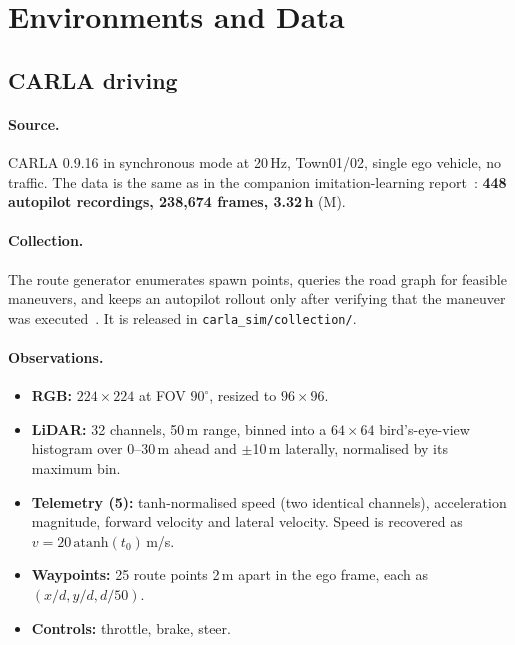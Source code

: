 \documentclass[11pt]{article}
\begin{document}
\section{Environments and Data}
\label{sec:data}

\subsection{CARLA driving}
\label{sec:carla-data}

\paragraph{Source.} CARLA 0.9.16 in synchronous mode at 20\,Hz, Town01/02, single ego vehicle, no traffic. The data is the same as in the companion imitation-learning report~\cite{kieto2026carla}: \textbf{448 autopilot recordings, 238,674 frames, 3.32\,h} (M).

\paragraph{Collection.} The route generator enumerates spawn points, queries the road graph for feasible maneuvers, and keeps an autopilot rollout only after verifying that the maneuver was executed~\cite{kieto2026carla}. It is released in \texttt{carla\_sim/collection/}.

\paragraph{Observations.}
\begin{itemize}
  \item \textbf{RGB:} $224\times224$ at FOV $90^\circ$, resized to $96\times96$.
  \item \textbf{LiDAR:} 32 channels, 50\,m range, binned into a $64\times64$ bird's-eye-view histogram over 0--30\,m ahead and $\pm$10\,m laterally, normalised by its maximum bin.
  \item \textbf{Telemetry (5):} tanh-normalised speed (two identical channels), acceleration magnitude, forward velocity and lateral velocity. Speed is recovered as $v = 20\,\mathrm{atanh}(t_0)$\,m/s.
  \item \textbf{Waypoints:} 25 route points 2\,m apart in the ego frame, each as $(x/d, y/d, d/50)$.
  \item \textbf{Controls:} throttle, brake, steer.
\end{itemize}
\end{document}
